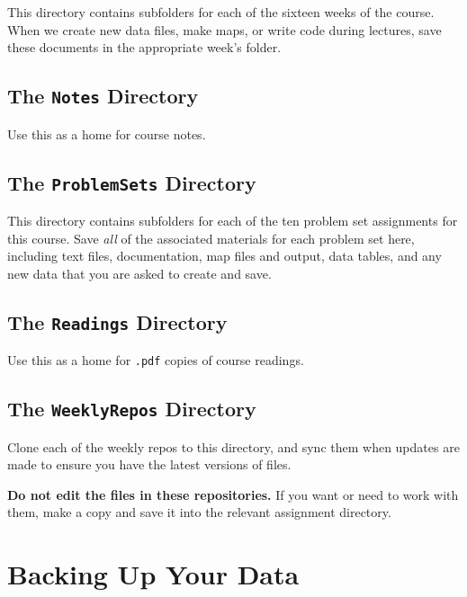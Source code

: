\documentclass[]{book}
\theoremstyle{definition}
\theoremstyle{definition}
\theoremstyle{definition}
\theoremstyle{remark}
\begin{document}
This directory contains subfolders for each of the sixteen weeks of the
course. When we create new data files, make maps, or write code during
lectures, save these documents in the appropriate week's folder.

\subsection{\texorpdfstring{The \texttt{Notes}
Directory}{The Notes Directory}}\label{the-notes-directory}

Use this as a home for course notes.

\subsection{\texorpdfstring{The \texttt{ProblemSets}
Directory}{The ProblemSets Directory}}\label{the-problemsets-directory}

This directory contains subfolders for each of the ten problem set
assignments for this course. Save \emph{all} of the associated materials
for each problem set here, including text files, documentation, map
files and output, data tables, and any new data that you are asked to
create and save.

\subsection{\texorpdfstring{The \texttt{Readings}
Directory}{The Readings Directory}}\label{the-readings-directory}

Use this as a home for \texttt{.pdf} copies of course readings.

\subsection{\texorpdfstring{The \texttt{WeeklyRepos}
Directory}{The WeeklyRepos Directory}}\label{the-weeklyrepos-directory}

Clone each of the weekly repos to this directory, and sync them when
updates are made to ensure you have the latest versions of files.

\textbf{Do not edit the files in these repositories.} If you want or
need to work with them, make a copy and save it into the relevant
assignment directory.

\section{Backing Up Your Data}\label{backing-up-your-data}
\end{document}
